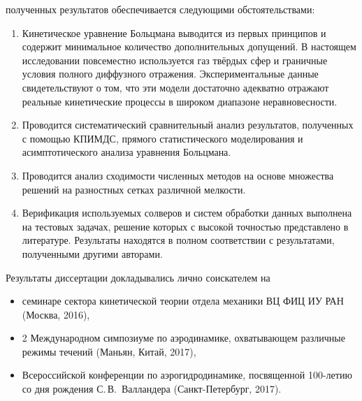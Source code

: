 {\reliability} полученных результатов обеспечивается следующими обстоятельствами:
\begin{enumerate}
    \item Кинетическое уравнение Больцмана выводится из первых принципов и
    содержит минимальное количество дополнительных допущений.
    В настоящем исследовании повсеместно используется газ твёрдых сфер
    и граничные условия полного диффузного отражения.
    Экспериментальные данные свидетельствуют о том, что эти модели достаточно адекватно отражают
    реальные кинетические процессы в широком диапазоне неравновесности.
    \item Проводится систематический сравнительный анализ результатов,
    полученных с помощью КПИМДС, прямого статистического моделирования
    и асимптотического анализа уравнения Больцмана.
    \item Проводится анализ сходимости численных методов на основе
    множества решений на разностных сетках различной мелкости.
    \item Верификация используемых солверов и систем обработки данных
    выполнена на тестовых задачах, решение которых с высокой точностью представлено в литературе.
    Результаты находятся в полном соответствии с результатами, полученными другими авторами.
\end{enumerate}

{\probation} Результаты диссертации докладывались лично соискателем на
\begin{itemize}
    \item семинаре сектора кинетической теории отдела механики ВЦ ФИЦ ИУ РАН (Москва, 2016),
    \item 2 Международном симпозиуме по аэродинамике, охватывающем различные режимы течений (Маньян, Китай, 2017),
    \item Всероссийской конференции по аэрогидродинамике, посвященной 100-летию со дня рождения С.\,В.~Валландера (Санкт-Петербург, 2017).
\end{itemize}

